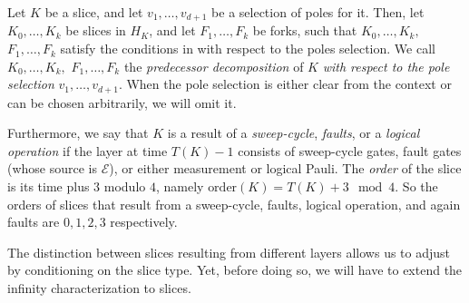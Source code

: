   \begin{definition}
    Let $K$ be a slice, and let $v_{1}, \ldots, v_{d+1}$ be a selection of poles for it. Then, let $K_{0}, \ldots, K_{k}$ be slices in $H_{K}$, and let $F_{1}, \ldots, F_{k}$ be forks, such that $K_{0}, \ldots, K_{k},$ $F_{1}, \ldots, F_{k}$ satisfy the conditions in  with respect to the poles selection. We call $K_{0}, \ldots, K_{k},$ $F_{1}, \ldots, F_{k}$ the \textit{predecessor decomposition} of $K$ \textit{with respect to the pole selection} $v_{1}, \ldots, v_{d+1}$. When the pole selection is either clear from the context or can be chosen arbitrarily, we will omit it.
  
    Furthermore, we say that $K$ is a result of a \textit{sweep-cycle}, \textit{faults}, or a \textit{logical operation} if the layer at time $T(K) - 1$ consists of sweep-cycle gates, fault gates (whose source is $\mathcal{E}$), or either measurement or logical Pauli. The \textit{order} of the slice is its time plus $3$ modulo $4$, namely $\text{order}(K) = T(K) + 3 \mod 4$. So the orders of slices that result from a sweep-cycle, faults, logical operation, and again faults are $0, 1, 2, 3$ respectively.
  \end{definition}
The distinction between slices resulting from different layers allows us to adjust  by conditioning on the slice type. Yet, before doing so, we will have to extend the infinity characterization to slices.



